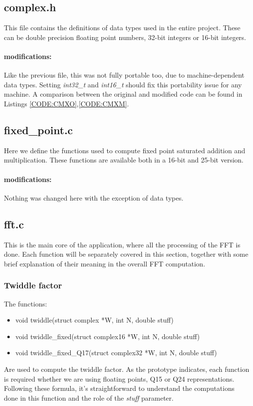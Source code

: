 \documentclass[a4paper]{article}
\begin{document}
\subsection{complex.h}
This file contains the definitions of data types used in the entire project. These can be double precision floating point numbers, 32-bit integers or 16-bit integers.
\paragraph{modifications:}
Like the previous file, this was not fully portable too, due to machine-dependent data types. Setting \textit{int32\_t} and \textit{int16\_t} should fix this portability issue for any machine. A comparison between the original and modified code can be found in Listings \ref{CODE:CMXO},\ref{CODE:CMXM}.

\subsection{fixed\_point.c}
Here we define the functions used to compute fixed point saturated addition and multiplication. These functions are available both in a 16-bit and 25-bit version.
\paragraph{modifications:}
Nothing was changed here with the exception of data types.

\subsection{fft.c}
This is the main core of the application, where all the processing of the FFT is done. Each function will be separately covered in this section, together with some brief explanation of their meaning in the overall FFT computation. 


\subsubsection{Twiddle factor}
The functions:
\begin{itemize}
	\item void twiddle(struct complex *W, int N, double stuff)
	\item void twiddle\_fixed(struct complex16 *W, int N, double stuff)         
	\item void twiddle\_fixed\_Q17(struct complex32 *W, int N, double stuff)
\end{itemize}
Are used to compute the twiddle factor. As the prototype indicates, each function is required whether we are using floating points, Q15 or Q24 representations.\\
Following these formula, it's straightforward to understand the computations done in this function and the role of the \textit{stuff} parameter.
\end{document}
